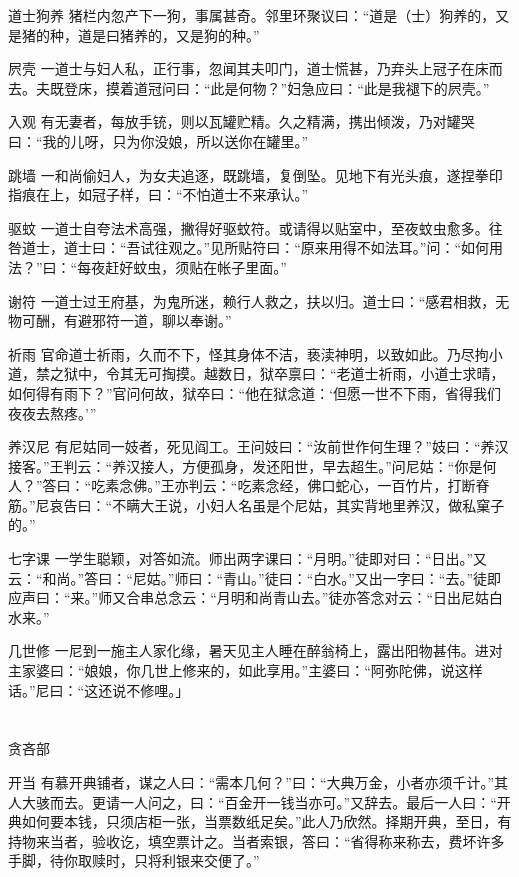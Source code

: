 \documentclass[12pt,UTF8]{ctexbook}
\begin{document}
道士狗养
猪栏内忽产下一狗，事属甚奇。邻里环聚议曰：“道是（士）狗养的，又是猪的种，道是曰猪养的，又是狗的种。”

屄壳
一道士与妇人私，正行事，忽闻其夫叩门，道士慌甚，乃弃头上冠子在床而去。夫既登床，摸着道冠问曰：“此是何物？”妇急应曰：“此是我褪下的屄壳。”

入观
有无妻者，每放手铳，则以瓦罐贮精。久之精满，携出倾泼，乃对罐哭曰：“我的儿呀，只为你没娘，所以送你在罐里。”

跳墙
一和尚偷妇人，为女夫追逐，既跳墙，复倒坠。见地下有光头痕，遂捏拳印指痕在上，如冠子样，曰：“不怕道士不来承认。”

驱蚊
一道士自夸法术高强，撇得好驱蚊符。或请得以贴室中，至夜蚊虫愈多。往咎道士，道士曰：“吾试往观之。”见所贴符曰：“原来用得不如法耳。”问：“如何用法？”曰：“每夜赶好蚊虫，须贴在帐子里面。”

谢符
一道士过王府基，为鬼所迷，赖行人救之，扶以归。道士曰：“感君相救，无物可酬，有避邪符一道，聊以奉谢。”

祈雨
官命道士祈雨，久而不下，怪其身体不洁，亵渎神明，以致如此。乃尽拘小道，禁之狱中，令其无可掏摸。越数日，狱卒禀曰：“老道士祈雨，小道士求晴，如何得有雨下？”官问何故，狱卒曰：“他在狱念道：‘但愿一世不下雨，省得我们夜夜去熬疼。’”

养汉尼
有尼姑同一妓者，死见阎工。王问妓曰：“汝前世作何生理？”妓曰：“养汉接客。”王判云：“养汉接人，方便孤身，发还阳世，早去超生。”问尼姑：“你是何人？”答曰：“吃素念佛。”王亦判云：“吃素念经，佛口蛇心，一百竹片，打断脊筋。”尼哀告曰：“不瞒大王说，小妇人名虽是个尼姑，其实背地里养汉，做私窠子的。”

七字课
一学生聪颖，对答如流。师出两字课曰：“月明。”徒即对曰：“日出。”又云：“和尚。”答曰：“尼姑。”师曰：“青山。”徒曰：“白水。”又出一字曰：“去。”徒即应声曰：“来。”师又合串总念云：“月明和尚青山去。”徒亦答念对云：“日出尼姑白水来。”

几世修
一尼到一施主人家化缘，暑天见主人睡在醉翁椅上，露出阳物甚伟。进对主家婆曰：“娘娘，你几世上修来的，如此享用。”主婆曰：“阿弥陀佛，说这样话。”尼曰：“这还说不修哩。」

\part{}

贪吝部

开当
有慕开典铺者，谋之人曰：“需本几何？”曰：“大典万金，小者亦须千计。”其人大骇而去。更请一人问之，曰：“百金开一钱当亦可。”又辞去。最后一人曰：“开典如何要本钱，只须店柜一张，当票数纸足矣。”此人乃欣然。择期开典，至日，有持物来当者，验收讫，填空票计之。当者索银，答曰：“省得称来称去，费坏许多手脚，待你取赎时，只将利银来交便了。”
\end{document}
